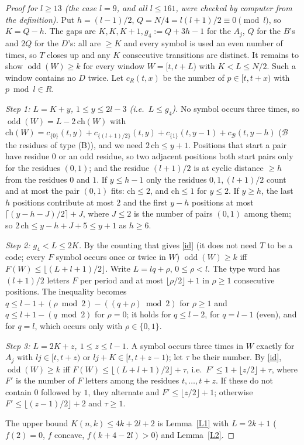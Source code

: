 \documentclass[11pt]{article}
\theoremstyle{remark}
\newcommand{\odd}{\operatorname{odd}}
\begin{document}
\begin{proof}[Proof for $l\ge 13$ (the case $l=9$, and all $l\le 161$, were checked by computer from the definition)]
Put $h=(l-1)/2$, $Q=N/4=l(l+1)/2\equiv 0 \pmod l$, so $K=Q-h$. The gaps are $K,K,K+1,g_4:=Q+3h-1$ for the $A_j$, $Q$ for the $B$'s and $2Q$ for the $D$'s:
all are $\ge K$ and every symbol is used an even number of times, so $T$ closes up and any $K$ consecutive transitions are distinct.
It remains to show $\odd(W)\ge k$ for every window $W=[t,t+L)$ with $K<L\le N/2$. Such a window contains no $D$ twice.
Let $c_R(t,x)$ be the number of $p\in[t,t+x)$ with $p \bmod l\in R$.

\emph{Step 1: $L=K+y$, $1\le y\le 2l-3$ (i.e.\ $L\le g_4$).} No symbol occurs three times, so $\odd(W)=L-2\,\mathrm{ch}(W)$ with
$\mathrm{ch}(W)=c_{\{0\}}(t,y)+c_{\{(l+1)/2\}}(t,y)+c_{\{1\}}(t,y-1)+c_{\mathcal B}(t,y-h)$ ($\mathcal B$ the residues of type (B)), and we need $2\,\mathrm{ch}\le y+1$.
Positions that start a pair have residue $0$ or an odd residue, so two adjacent positions both start pairs only for the residues $(0,1)$;
and the residue $(l+1)/2$ is at cyclic distance $\ge h$ from the residues $0$ and $1$.
If $y\le h-1$ only the residues $0,1,(l+1)/2$ count and at most the pair $(0,1)$ fits: $\mathrm{ch}\le 2$, and $\mathrm{ch}\le1$ for $y\le 2$.
If $y\ge h$, the last $h$ positions contribute at most $2$ and the first $y-h$ positions at most $\lceil (y-h-J)/2\rceil+J$, where $J\le 2$ is the
number of pairs $(0,1)$ among them; so $2\,\mathrm{ch}\le y-h+J+5\le y+1$ as $h\ge 6$.

\emph{Step 2: $g_4<L\le 2K$.} By the counting that gives \eqref{id} (it does not need $T$ to be a code; every $F$ symbol occurs once or twice in $W$) $\odd(W)\ge k$ iff $F(W)\le\lfloor (L+l+1)/2\rfloor$.
Write $L=lq+\rho$, $0\le\rho<l$. The type word has $(l+1)/2$ letters $F$ per period and at most $\lfloor\rho/2\rfloor+1$ in $\rho\ge1$ consecutive positions.
The inequality becomes $q\le l-1+(\rho\bmod 2)-((q+\rho)\bmod 2)$ for $\rho\ge 1$ and $q\le l+1-(q\bmod 2)$ for $\rho=0$; it holds for $q\le l-2$, for $q=l-1$ (even),
and for $q=l$, which occurs only with $\rho\in\{0,1\}$.

\emph{Step 3: $L=2K+z$, $1\le z\le l-1$.} A symbol occurs three times in $W$ exactly for $A_j$ with $lj\in[t,t+z)$ or $lj+K\in[t,t+z-1)$; let $\tau$ be their number.
By \eqref{id}, $\odd(W)\ge k$ iff $F(W)\le\lfloor (L+l+1)/2\rfloor+\tau$, i.e.\ $F'\le 1+\lfloor z/2\rfloor+\tau$, where $F'$ is the number of $F$ letters among the
residues $t,\dots,t+z$. If these do not contain $0$ followed by $1$, they alternate and $F'\le\lfloor z/2\rfloor+1$; otherwise $F'\le\lfloor (z-1)/2\rfloor+2$ and $\tau\ge1$.

The upper bound $K(n,k)\le 4k+2l+2$ is Lemma~\ref{L1} with $L=2k+1$ ($f(2)=0$, $f$ concave, $f(k+4-2l)>0$) and Lemma~\ref{L2}.
\end{proof}
\end{document}
